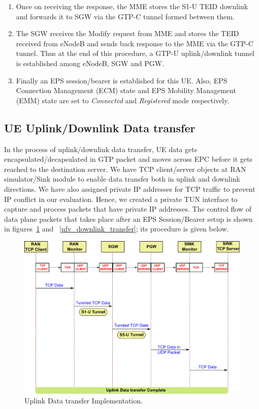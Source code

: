 \documentclass[hidelinks]{report}
\begin{document}
\begin{enumerate}
\begin{enumerate}
\item Once on receiving the response, the MME stores the S1-U TEID downlink and forwards it to SGW via the GTP-C tunnel formed between them.

\item The SGW receives the Modify request from MME and stores the TEID received from eNodeB and sends back response to the MME via the GTP-C tunnel. Thus at the end of this procedure, a GTP-U uplink/downlink tunnel is established among eNodeB, SGW and PGW.

\item Finally an EPS session/bearer is established for this UE. Also, EPS Connection Management (ECM) state and EPS Mobility Management (EMM) state are set to \textit{Connected} and \textit{Registered} mode respectively.

\end{enumerate}

\end{enumerate}

\subsection*{UE Uplink/Downlink Data transfer}

In the process of uplink/downlink data transfer, UE data gets encapsulated/decapsulated in GTP packet and moves across EPC before it gets reached to the destination server. We have TCP client/server objects at RAN simulator/Sink module to enable data transfer both in uplink and downlink directions. We have also assigned private IP addresses for TCP traffic to prevent IP conflict in our evaluation. Hence, we created a private TUN interface to capture and process packets that have private IP addresses. The control flow of data plane packets that takes place after an EPS Session/Bearer setup is shown in figures~\ref{nfv_uplink_transfer} and ~\ref{nfv_downlink_transfer}; its procedure is given below.

\begin{figure}[h]

\centering
\includegraphics[scale=0.5]{nfv_uplink_transfer}
\caption{Uplink Data transfer Implementation.}
\label{nfv_uplink_transfer}

\end{figure}
\end{document}
